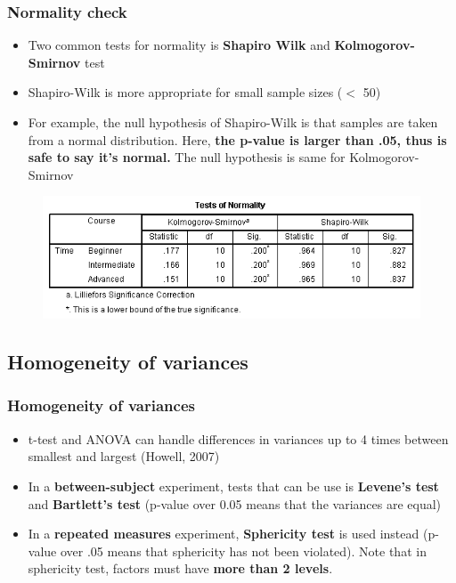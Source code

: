 \documentclass{beamer}
\begin{document}
\begin{frame}
	\frametitle{Normality check} 
	\begin{itemize}
		\item Two common tests for normality is \textbf{Shapiro Wilk} and \textbf{Kolmogorov-Smirnov} test %
		\item Shapiro-Wilk is more appropriate for small sample sizes ($<$ 50)
		\item For example, the null hypothesis of Shapiro-Wilk is that samples are taken from a normal distribution.  Here, \textbf{the p-value is larger than .05, thus is safe to say it's normal.}   The null hypothesis is same for Kolmogorov-Smirnov 
	\end{itemize}
	\begin{figure}
		\includegraphics[width=0.8\linewidth]{normality}
	\end{figure}
\end{frame}

\subsection{Homogeneity of variances}

\begin{frame}
	\frametitle{Homogeneity of variances} 
	\begin{itemize}
		\item t-test and ANOVA can handle differences in variances up to 4 times between smallest and largest (Howell, 2007)
		\item In a \textbf{between-subject }experiment, tests that can be use is \textbf{Levene's test} and \textbf{Bartlett's test} (p-value over 0.05 means that the variances are equal)
		\item In a\textbf{ repeated measures} experiment, \textbf{Sphericity test} is used instead (p-value over .05 means that sphericity has not been violated).   Note that in sphericity test, factors must have \textbf{more than 2 levels}.
	\end{itemize}
\end{frame}
\end{document}

